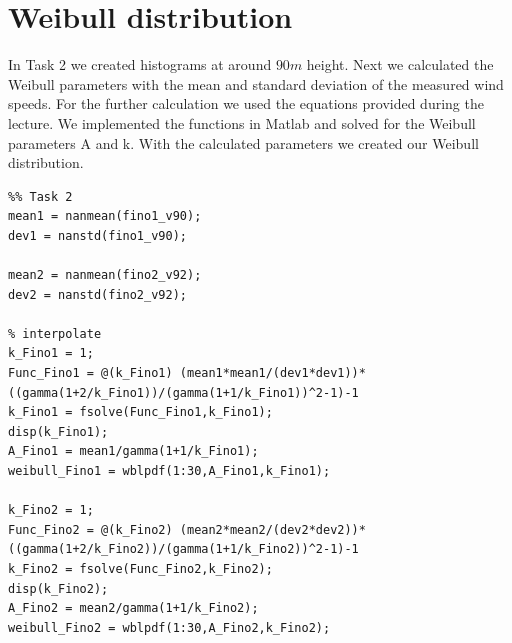\documentclass[10pt]{article}
\begin{document}
\newpage
\section{Weibull distribution}
In Task 2 we created histograms at around $90m$ height. Next we calculated the Weibull parameters with the mean and standard deviation of the measured wind speeds. For the further calculation we used the equations provided during the lecture. We implemented the functions in Matlab and solved for the Weibull parameters A and k. With the calculated parameters we created our Weibull distribution.


\begin{lstlisting}
%% Task 2
mean1 = nanmean(fino1_v90);
dev1 = nanstd(fino1_v90);

mean2 = nanmean(fino2_v92);
dev2 = nanstd(fino2_v92);

% interpolate
k_Fino1 = 1;
Func_Fino1 = @(k_Fino1) (mean1*mean1/(dev1*dev1))*((gamma(1+2/k_Fino1))/(gamma(1+1/k_Fino1))^2-1)-1 
k_Fino1 = fsolve(Func_Fino1,k_Fino1);
disp(k_Fino1);
A_Fino1 = mean1/gamma(1+1/k_Fino1);
weibull_Fino1 = wblpdf(1:30,A_Fino1,k_Fino1);

k_Fino2 = 1;
Func_Fino2 = @(k_Fino2) (mean2*mean2/(dev2*dev2))*((gamma(1+2/k_Fino2))/(gamma(1+1/k_Fino2))^2-1)-1 
k_Fino2 = fsolve(Func_Fino2,k_Fino2);
disp(k_Fino2);
A_Fino2 = mean2/gamma(1+1/k_Fino2);
weibull_Fino2 = wblpdf(1:30,A_Fino2,k_Fino2);
\end{lstlisting}
\end{document}
